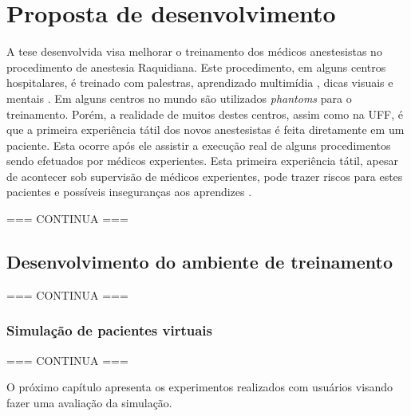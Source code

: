\chapter{Proposta de desenvolvimento} \label{cap:cap4}

A tese desenvolvida visa melhorar o treinamento dos médicos anestesistas no procedimento de anestesia Raquidiana. Este procedimento, em alguns centros hospitalares, é treinado com palestras, aprendizado multimídia \cite{Udani2015}, dicas visuais e mentais \cite{Dreifaldt2006}. Em alguns centros no mundo são utilizados \textit{phantoms} para o treinamento.  Porém, a realidade de muitos destes centros, assim como na UFF, é que a primeira experiência tátil dos novos anestesistas é feita diretamente em um paciente. Esta ocorre após ele assistir a execução real de alguns procedimentos sendo efetuados por médicos experientes. Esta primeira experiência tátil, apesar de acontecer sob supervisão de médicos experientes, pode trazer riscos para estes pacientes e possíveis inseguranças aos aprendizes \cite{Elmofty2017}.

=== CONTINUA ===

\section{Desenvolvimento do ambiente de treinamento}
\label{sec:Dese}

=== CONTINUA ===

\subsection{Simulação de pacientes virtuais}
\label{sec:Pacientes}

=== CONTINUA ===


O próximo capítulo apresenta os experimentos realizados com usuários visando fazer uma avaliação da simulação.
